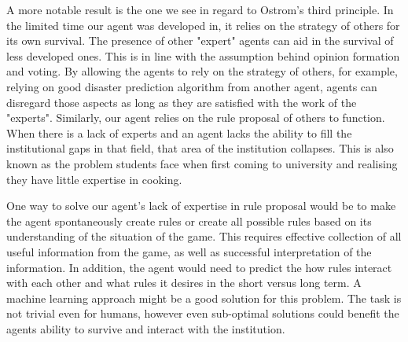 A more notable result is the one we see in regard to Ostrom's third principle. In the limited time our agent was developed in, it relies on the strategy of others for its own survival. The presence of other "expert" agents can aid in the survival of less developed ones. This is in line with the assumption behind opinion formation and voting. By allowing the agents to rely on the strategy of others, for example, relying on good disaster prediction algorithm from another agent, agents can disregard those aspects as long as they are satisfied with the work of the "experts". Similarly, our agent relies on the rule proposal of others to function. When there is a lack of experts and an agent lacks the ability to fill the institutional gaps in that field, that area of the institution collapses. This is also known as the problem students face when first coming to university and realising they have little expertise in cooking. 

One way to solve our agent's lack of expertise in rule proposal would be to make the agent spontaneously create rules or create all possible rules based on its understanding of the situation of the game. This requires effective collection of all useful information from the game, as well as successful interpretation of the information. In addition, the agent would need to predict the how rules interact with each other and what rules it desires in the short versus long term. A machine learning approach might be a good solution for this problem. The task is not trivial even for humans, however even sub-optimal solutions could benefit the agents ability to survive and interact with the institution.